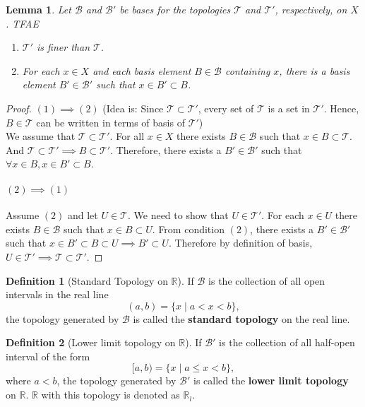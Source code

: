 \documentclass[12pt,reqno]{amsart}
\theoremstyle{plain}
\newtheorem{lem}{Lemma}
\theoremstyle{definition}
\newtheorem{defn}{Definition}
\begin{document}
\begin{lem}
    Let $\mathcal{B}$ and $\mathcal{B}'$ be bases for the topologies $\mathcal{T}$ and $\mathcal{T}'$, respectively, on $X$. TFAE
    \begin{enumerate}
        \item $\mathcal{T}'$ is finer than $\mathcal{T}.$
        \item For each $x \in X$ and each basis element $B \in \mathcal{B}$ containing $x$, there is a basis element $B' \in \mathcal{B}'$ such that $x \in B' \subset B$.
    \end{enumerate}
\end{lem}
\begin{proof}
    $(1) \implies (2)$     (Idea is: Since $\mathcal{T} \subset \mathcal{T}'$, every set of $\mathcal{T}$ is a set in $\mathcal{T}'$. Hence, $B \in \mathcal{T}$ can be written in terms of basis of $\mathcal{T}'$)\\ 
    We assume that $\mathcal{T} \subset \mathcal{T}'.$ For all $x \in X$ there exists $B \in \mathcal{B}$ such that $x \in B \subset \mathcal{T}$. And $\mathcal{T} \subset \mathcal{T}' \implies B \subset \mathcal{T}'$. Therefore, there exists a $B' \in \mathcal{B}'$ such that $ \forall x \in B, x \in B' \subset B$.
    \paragraph{$(2) \implies (1)$} Assume $(2)$ and let $U \in \mathcal{T}$. We need to show that $U \in \mathcal{T}'$. For each $x \in U$ there exists $B \in \mathcal{B}$ such that $x \in B \subset U$. From condition $(2)$, there exists a $B' \in \mathcal{B}'$ such that $x \in B' \subset B \subset U \implies B' \subset U$. Therefore by definition of basis, $U \in \mathcal{T}' \implies \mathcal{T} \subset \mathcal{T}'$.
\end{proof}
\begin{defn}[Standard Topology on $\mathbb{R}$]
    If $\mathcal{B}$ is the collection of all open intervals in the real line
    $$ (a,b) = \{x \mid a < x < b\},$$
    the topology generated by $\mathcal{B}$ is called the {\bf standard topology} on the real line.
\end{defn}
\begin{defn}[Lower limit topology on $\mathbb{R}$]
    If $\mathcal{B}'$ is the collection of all half-open interval of the form 
    $$ [a,b) = \{x \mid a \leq x < b\},$$
    where $a < b$, the topology generated by $\mathcal{B}'$ is called the {\bf lower limit topology} on $\mathbb{R}$. $\mathbb{R}$ with this topology is denoted as $\mathbb{R}_l$.
\end{defn}
\end{document}
